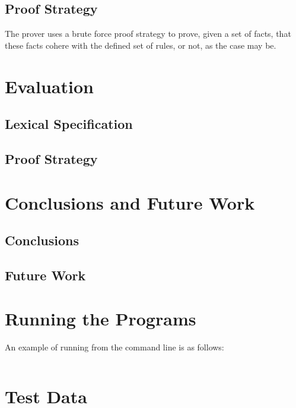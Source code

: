 \documentclass{l4proj}
\begin{document}
\section{Proof Strategy}

The prover uses a brute force proof strategy to prove, given a set of facts, that these facts cohere with the defined set of rules, or not, as the case may be. 


\chapter{Evaluation}

\section{Lexical Specification}

\section{Proof Strategy}

\chapter{Conclusions and Future Work}

\section{Conclusions}

\section{Future Work}

\begin{appendices}

\chapter{Running the Programs}
An example of running from the command line is as follows:
\begin{verbatim}
\end{verbatim}

\chapter{Test Data}

\end{appendices}




\end{document}
